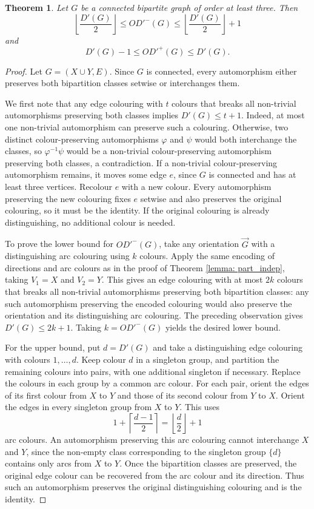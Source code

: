 \documentclass[a4paper,12pt]{elsarticle}
\newtheorem{theorem}{Theorem}
\newcommand{\orG}{\ensuremath{\overrightarrow{G}}}
\begin{document}
\begin{theorem} \label{thm: bipartite_bounds}
Let $G$ be a connected bipartite graph of order at least three. Then
\[
\left\lfloor\frac{D'(G)}{2}\right\rfloor
\leq OD'^-(G)
\leq \left\lfloor\frac{D'(G)}{2}\right\rfloor+1
\]
and
\[
D'(G)-1\leq OD'^+(G)\leq D'(G).
\]
\end{theorem}
\begin{proof}
Let $G=(X\cup Y,E)$. Since $G$ is connected, every automorphism either preserves both bipartition classes setwise or interchanges them.

We first note that any edge colouring with $t$ colours that breaks all non-trivial automorphisms preserving both classes implies $D'(G)\leq t+1$. Indeed, at most one non-trivial automorphism can preserve such a colouring. Otherwise, two distinct colour-preserving automorphisms $\varphi$ and $\psi$ would both interchange the classes, so $\varphi^{-1}\psi$ would be a non-trivial colour-preserving automorphism preserving both classes, a contradiction. If a non-trivial colour-preserving automorphism remains, it moves some edge $e$, since $G$ is connected and has at least three vertices. Recolour $e$ with a new colour. Every automorphism preserving the new colouring fixes $e$ setwise and also preserves the original colouring, so it must be the identity. If the original colouring is already distinguishing, no additional colour is needed.

To prove the lower bound for $OD'^-(G)$, take any orientation $\orG$ with a distinguishing arc colouring using $k$ colours. Apply the same encoding of directions and arc colours as in the proof of Theorem \ref{lemma: part_indep}, taking $V_1=X$ and $V_2=Y$. This gives an edge colouring with at most $2k$ colours that breaks all non-trivial automorphisms preserving both bipartition classes: any such automorphism preserving the encoded colouring would also preserve the orientation and its distinguishing arc colouring. The preceding observation gives $D'(G)\leq 2k+1$. Taking $k=OD'^-(G)$ yields the desired lower bound.

For the upper bound, put $d=D'(G)$ and take a distinguishing edge colouring with colours $1,\ldots,d$. Keep colour $d$ in a singleton group, and partition the remaining colours into pairs, with one additional singleton if necessary. Replace the colours in each group by a common arc colour. For each pair, orient the edges of its first colour from $X$ to $Y$ and those of its second colour from $Y$ to $X$. Orient the edges in every singleton group from $X$ to $Y$. This uses
\[
1+\left\lceil\frac{d-1}{2}\right\rceil
=\left\lfloor\frac{d}{2}\right\rfloor+1
\]
arc colours. An automorphism preserving this arc colouring cannot interchange $X$ and $Y$, since the non-empty class corresponding to the singleton group $\{d\}$ contains only arcs from $X$ to $Y$. Once the bipartition classes are preserved, the original edge colour can be recovered from the arc colour and its direction. Thus such an automorphism preserves the original distinguishing colouring and is the identity.


\end{proof}
\end{document}
